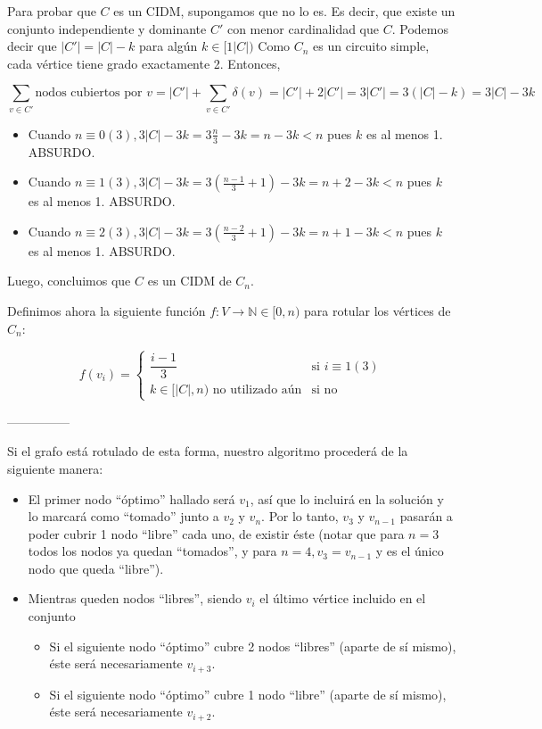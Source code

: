 Para probar que $C$ es un CIDM, supongamos que no lo es.  Es decir, que existe un conjunto independiente y dominante $C'$ con menor cardinalidad que $C$.  Podemos decir que $|C'| = |C| - k$ para algún $k \in [1 |C|)$ Como $C_n$ es un circuito simple, cada vértice tiene grado exactamente 2.  Entonces,

\begin{equation*}
\sum_{v \in C'} \text{nodos cubiertos por }v = |C'| + \sum_{v \in C'} \delta(v) = |C'| + 2|C'| = 3 |C'| = 3(|C| - k) = 3|C| - 3k
\end{equation*}

\begin{itemize}
	\item Cuando $n \equiv 0 (3), 3|C| - 3k = 3\frac{n}{3} - 3k = n-3k < n$ pues $k$ es al menos 1. ABSURDO.
	\item Cuando $n \equiv 1 (3), 3|C| - 3k = 3(\frac{n-1}{3} + 1) - 3k = n+2-3k < n$ pues $k$ es al menos 1. ABSURDO.
	\item Cuando $n \equiv 2 (3), 3|C| - 3k = 3(\frac{n-2}{3} + 1) - 3k = n+1-3k < n$ pues $k$ es al menos 1. ABSURDO.
\end{itemize}

Luego, concluimos que $C$ es un CIDM de $C_n$.

Definimos ahora la siguiente función $f:V \rightarrow \mathbb{N} \in [0,n)$ para rotular los vértices de $C_n$:

\begin{equation*}
f(v_i) = \begin{cases}
\dfrac{i-1}{3} & \text{si } i \equiv 1 (3)\\
k \in [|C|,n) \text{ no utilizado aún} & \text{si no}
\end{cases}
\end{equation*}


---------------

Si el grafo está rotulado de esta forma, nuestro algoritmo procederá de la siguiente manera:

\begin{itemize}
\item El primer nodo ``óptimo'' hallado será $v_1$, así que lo incluirá en la solución y lo marcará como ``tomado'' junto a $v_2$ y $v_n$. Por lo tanto, $v_3$ y $v_{n-1}$ pasarán a poder cubrir 1 nodo ``libre'' cada uno, de existir éste (notar que para $n = 3$ todos los nodos ya quedan ``tomados'', y para $n = 4, v_3 = v_{n-1}$ y es el único nodo que queda ``libre'').
\item Mientras queden nodos ``libres'', siendo $v_i$ el último vértice incluido en el conjunto

	\begin{itemize}
	\item Si el siguiente nodo ``óptimo'' cubre 2 nodos ``libres'' (aparte de sí mismo), éste será necesariamente $v_{i+3}$.
	\item Si el siguiente nodo ``óptimo'' cubre 1 nodo ``libre'' (aparte de sí mismo), éste será necesariamente $v_{i+2}$.
	\end{itemize}

\end{itemize}

